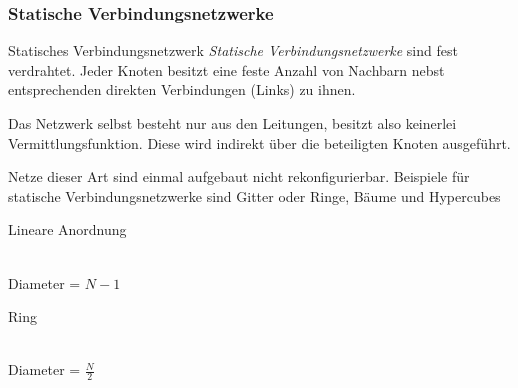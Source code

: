\subsubsection{Statische Verbindungsnetzwerke}

\begin{defi}{Statisches Verbindungsnetzwerk}
    \emph{Statische Verbindungsnetzwerke} sind fest verdrahtet.
    Jeder Knoten besitzt eine feste Anzahl von Nachbarn nebst entsprechenden direkten Verbindungen (Links) zu ihnen.
    
    Das Netzwerk selbst besteht nur aus den Leitungen, besitzt also keinerlei Vermittlungsfunktion.
    Diese wird indirekt über die beteiligten Knoten ausgeführt.
    
    Netze dieser Art sind einmal aufgebaut nicht rekonfigurierbar.
    Beispiele für statische Verbindungsnetzwerke sind Gitter oder Ringe, Bäume und Hypercubes
\end{defi}

\begin{defi}{Lineare Anordnung}
    \begin{center}
        \\
        Diameter = $N-1$
    \end{center}
\end{defi}

\begin{defi}{Ring}
    \begin{center}
        \\
        Diameter = $\frac{N}{2}$
    \end{center}
\end{defi}

